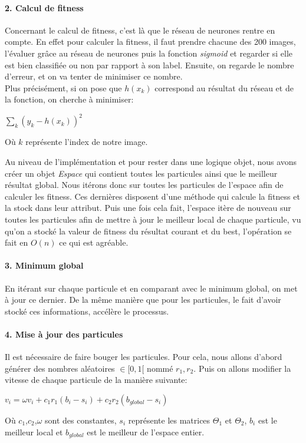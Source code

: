 \documentclass[a4paper, 11pt]{article}
\begin{document}
\paragraph{2. Calcul de fitness}
Concernant le calcul de fitness, c'est là que le réseau de neurones rentre en compte. En effet pour calculer la fitness, il faut prendre
chacune des 200 images, l'évaluer grâce au réseau de neurones puis la fonction \textit{sigmoid} et regarder si elle est bien classifiée ou 
non par rapport à son label. Ensuite, on regarde le nombre d'erreur, et on va tenter de minimiser ce nombre.
\\Plus précisément, si on pose que $h(x_k)$ correspond au résultat du réseau et de la fonction, on cherche à minimiser:
\begin{center}
 \begin{math}
    \sum\limits_k(y_k - h(x_k))^2
 \end{math}
\end{center}
Où $k$ représente l'index de notre image.

Au niveau de l'implémentation et pour rester dans une logique objet, nous avons créer un objet \textit{Espace} qui contient toutes les
particules ainsi que le meilleur résultat global. Nous itérons donc sur toutes les particules de l'espace afin de calculer les fitness.
Ces dernières disposent d'une méthode qui calcule la fitness et la stock dans leur attribut.
Puis une fois cela fait, l'espace itère de nouveau sur toutes les particules afin de mettre à jour le meilleur local de chaque particule, 
vu qu'on a stocké la valeur de fitness du résultat courant et du best, l'opération se fait en $O(n)$ ce qui est agréable.

\paragraph{3. Minimum global}
En itérant sur chaque particule et en comparant avec le minimum global, on met à jour ce dernier. De la même manière que pour les 
particules, le fait d'avoir stocké ces informations, accélère le processus.

\paragraph{4. Mise à jour des particules}
Il est nécessaire de faire bouger les particules. Pour cela, nous allons d'abord générer des nombres aléatoires $\in [0,1[$ nommé 
$r_1,r_2$. Puis on allons modifier la vitesse de chaque particule de la manière suivante:
\begin{center}
 \begin{math}
  v_i = \omega v_i + c_1 r_1 (b_i - s_i ) + c_2 r_2 (b_{global} - s_i)
 \end{math}
\end{center}
Où $c_1$,$c_2$,$\omega$ sont des constantes, $s_i$ représente les matrices $\Theta_1$ et $\Theta_2$, $b_i$ est le meilleur local et 
$b_{global}$ est le meilleur de l'espace entier.
\end{document}
